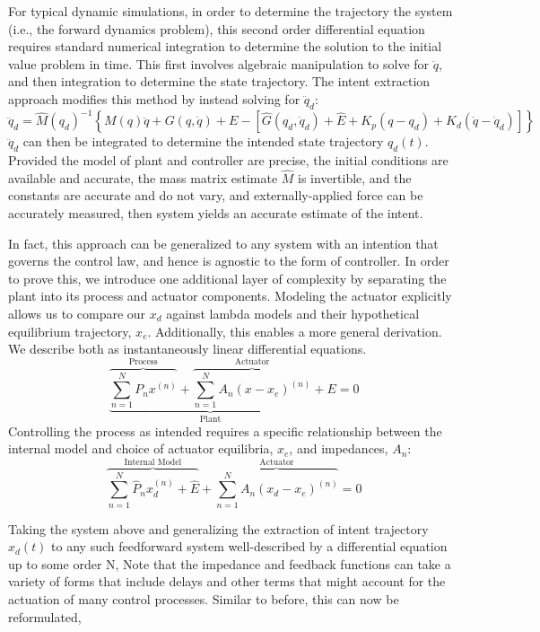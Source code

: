 \documentclass[10pt]{article}
\begin{document}
For typical dynamic simulations, in order to determine the trajectory the system (i.e., the forward dynamics problem), this second order differential equation requires standard numerical integration to determine the solution to the initial value problem in time. This first involves algebraic manipulation to solve for $\ddot{q}$, and then integration to determine the state trajectory. The intent extraction approach modifies this method by instead solving for $\ddot{q}_d$:
\begin{equation}
\ddot{q}_d=\hat{M}(q_d)^{-1}\left\{M(q)\ddot{q}+G(q,\dot{q})+E-[\hat{G}(q_d,\dot{q}_d)+\hat{E}+K_p(q-q_d)+K_d(\dot{q}-\dot{q}_d)]\right\}
\end{equation}  
$\ddot{q}_d$ can then be integrated to determine the intended state trajectory $q_d(t)$. Provided the model of plant and controller are precise, the initial conditions are available and accurate, the mass matrix estimate $\hat{M}$ is invertible, and the constants are accurate and do not vary, and externally-applied force can be accurately measured, then system yields an accurate estimate of the intent.

In fact, this approach can be generalized to any system with an intention that governs the control law, and hence is agnostic to the form of controller. In order to prove this, we introduce one additional layer of complexity by separating the plant into its process and actuator components. Modeling the actuator explicitly allows us to compare our $x_d$ against lambda models \cite{feldman1995origin} and their hypothetical equilibrium trajectory, $x_e$. Additionally, this enables a more general derivation. We describe both as instantaneously linear differential equations.
\begin{equation}
\underbrace{\overbrace{\sum_{n=1}^N P_nx^{(n)}}^\text{Process}+\overbrace{\sum_{n=1}^N A_n(x-x_e)^{(n)}}^\text{Actuator}}_\text{Plant}+E=0
\end{equation}
Controlling the process as intended requires a specific relationship between the internal model and choice of actuator equilibria, $x_e$, and impedances, $A_n$:
\begin{equation}
\overbrace{\sum_{n=1}^N \hat{P}_n x^{(n)}_d+\hat{E}}^\text{Internal Model}+\overbrace{\sum_{n=1}^N A_n(x_d-x_e)^{(n)}}^\text{Actuator}=0
\end{equation}


 Taking the system above and generalizing the extraction of intent trajectory $x_d(t)$ to any such feedforward system well-described by a differential equation up to some order N,
Note that the impedance and feedback functions can take a variety of forms that include delays and other terms that might account for the actuation of many control processes. Similar to before, this can now be reformulated,
\end{document}
